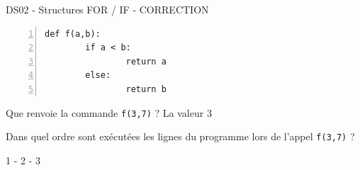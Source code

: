 \documentclass[a4paper,12pt,openany]{book}
\begin{document}
\begin{center}\begin{large}
DS02 - Structures FOR / IF - CORRECTION
\end{large}\end{center}

\exo

\begin{minipage}{9cm}
	\begin{lstlisting}[numbers=left]
def f(a,b):
		if a < b:
				return a
		else:
				return b
\end{lstlisting}
\end{minipage}
\begin{minipage}{9cm}
\begin{liste}
	\item 	Que renvoie la commande \verb+f(3,7)+ ? La valeur 3
	\item Dans quel ordre sont exécutées les lignes du programme lors de l'appel \verb+f(3,7)+ ? 
	
	1 - 2 - 3
	\end{liste}
\end{minipage}	

	
	
	\bigskip

\exo
\end{document}
